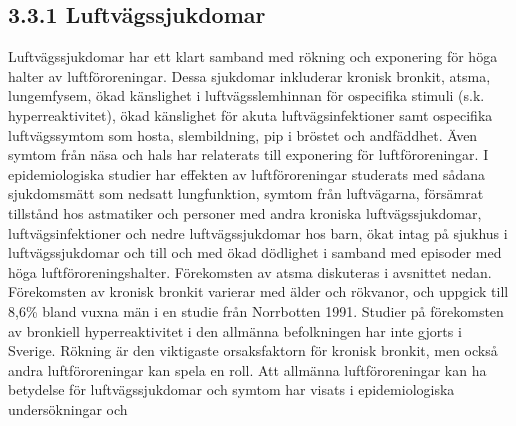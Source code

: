 \subsection*{3.3.1 Luftvägssjukdomar}
Luftvägssjukdomar har ett klart samband med rökning och exponering för höga halter av luftföroreningar. Dessa sjukdomar inkluderar kronisk bronkit, atsma, lungemfysem, ökad känslighet i luftvägsslemhinnan för ospecifika stimuli (s.k. hyperreaktivitet), ökad känslighet för akuta luftvägsinfektioner samt ospecifika luftvägssymtom som hosta, slembildning, pip i bröstet och andfäddhet. Även symtom från näsa och hals har relaterats till exponering för luftföroreningar. I epidemiologiska studier har effekten av luftföroreningar studerats med sådana sjukdomsmätt som nedsatt lungfunktion, symtom från luftvägarna, försämrat tillstånd hos astmatiker och personer med andra kroniska luftvägssjukdomar, luftvägsinfektioner och nedre luftvägssjukdomar hos barn, ökat intag på sjukhus i luftvägssjukdomar och till och med ökad dödlighet i samband med episoder med höga luftföroreningshalter.
Förekomsten av atsma diskuteras i avsnittet nedan. Förekomsten av kronisk bronkit varierar med älder och rökvanor, och uppgick till 8,6\% bland vuxna män i en studie från Norrbotten 1991. Studier på förekomsten av bronkiell hyperreaktivitet i den allmänna befolkningen har inte gjorts i Sverige.
Rökning är den viktigaste orsaksfaktorn för kronisk bronkit, men också andra luftföroreningar kan spela en roll. Att allmänna luftföroreningar kan ha betydelse för luftvägssjukdomar och symtom har visats i epidemiologiska undersökningar och

